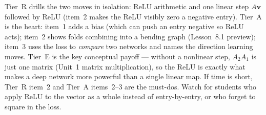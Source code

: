 \documentclass[10pt]{article}
\newcommand{\vv}{\mathbf{v}}
\begin{document}
\begin{teachernote}
Tier~R drills the two moves in isolation: ReLU arithmetic and one linear step $A\vv$ followed by ReLU
(item~2 makes the ReLU visibly zero a negative entry). Tier~A is the heart: item~1 adds a bias (which can
push an entry negative so ReLU acts); item~2 shows folds combining into a bending graph (Lesson~8.1
preview); item~3 uses the loss to \emph{compare} two networks and names the direction learning moves.
Tier~E is the key conceptual payoff --- without a nonlinear step, $A_2A_1$ is just one matrix (Unit~1
matrix multiplication), so the ReLU is exactly what makes a deep network more powerful than a single
linear map. If time is short, Tier~R item~2 and Tier~A items~2--3 are the must-dos. Watch for students who
apply ReLU to the vector as a whole instead of entry-by-entry, or who forget to square in the loss.
\end{teachernote}
\end{document}
